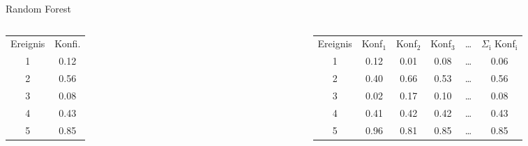 \documentclass[aspectratio=1610, professionalfonts, 9pt]{beamer}
\begin{document}
\begin{frame}{Random Forest}
  \begin{columns}
	\begin{table}
	  \centering
	  \begin{tabular}{c c}
		\toprule
		Ereignis & Konfi. \\
		\cmidrule(r){1-1} \cmidrule(l){2-2}
		1 & \num{0.12} \\
		2 & \num{0.56} \\
		3 & \num{0.08} \\
		4 & \num{0.43} \\
		5 & \num{0.85} \\
		\bottomrule
	  \end{tabular}
	\end{table}
	\begin{table}
	  \centering
	  \begin{tabular}{c c c c c c}
		\toprule
		Ereignis & Konf$_{1}$ & Konf$_{2}$ & Konf$_{3}$ & \dots & $\Sigma_\text{i}$ Konf$_\text{i}$ \\
		\cmidrule(r){1-1} \cmidrule(lr){2-5} \cmidrule(l){6-6}
		1 & \num{0.12} & \num{0.01} & \num{0.08} & \dots & \num{0.06} \\
		2 & \num{0.40} & \num{0.66} & \num{0.53} & \dots & \num{0.56} \\
		3 & \num{0.02} & \num{0.17} & \num{0.10} & \dots & \num{0.08} \\
		4 & \num{0.41} & \num{0.42} & \num{0.42} & \dots & \num{0.43} \\
		5 & \num{0.96} & \num{0.81} & \num{0.85} & \dots & \num{0.85} \\
		\bottomrule
	  \end{tabular}
	\end{table}
  \end{columns}
\end{frame}
\end{document}
